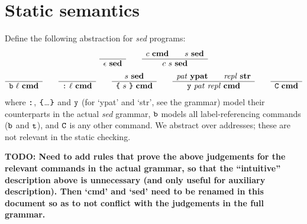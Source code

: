\documentclass[11pt]{article}
\newcommand\SED{\emph{sed}}
\newcommand\RULE[3][]{\begin{array}{c} #2 \\ \hline #3 \end{array}}
\newcommand\J[1]{\ensuremath{\textbf{#1}}}
\newcommand\cmd[1]{\ensuremath{\text{\texttt{#1}}}}
\renewcommand\arg[1]{\ensuremath{\mathit{#1}}}
\begin{document}
\section{Static semantics}

Define the following abstraction for \SED{} programs:
\begin{gather*}
	\RULE{}{\epsilon\ \J{sed}} \qquad
	\RULE{c\ \J{cmd} \qquad s\ \J{sed}}{c\ s\ \J{sed}} \\
	\RULE{}{\cmd{b}\ \arg{\ell}\ \J{cmd}} \qquad
	\RULE{}{\cmd{:}\ \arg{\ell}\ \J{cmd}} \qquad
	\RULE{s\ \J{sed}}{\cmd{\{}\ s\ \cmd{\}}\ \J{cmd}} \qquad
	\RULE{\arg{pat}\ \J{ypat} \qquad \arg{repl}\ \J{str}}{\cmd{y}\ \arg{pat}\ \arg{repl}\ \J{cmd}} \qquad
	\RULE{}{\cmd{C}\ \J{cmd}}
\end{gather*}
where \cmd{:}, \cmd{\{}\ldots\!\cmd{\}} and \cmd{y} (for `ypat' and `str', see the grammar) model their counterparts in the actual \SED{} grammar, \cmd{b} models all label-referencing commands (\cmd{b} and \cmd{t}), and \cmd{C} is any other command.
We abstract over addresses; these are not relevant in the static checking.

\textbf{TODO: Need to add rules that prove the above judgements for the relevant commands in the actual grammar, so that the ``intuitive'' description above is unnecessary (and only useful for auxiliary description). Then `cmd' and `sed' need to be renamed in this document so as to not conflict with the judgements in the full grammar.}
\end{document}

